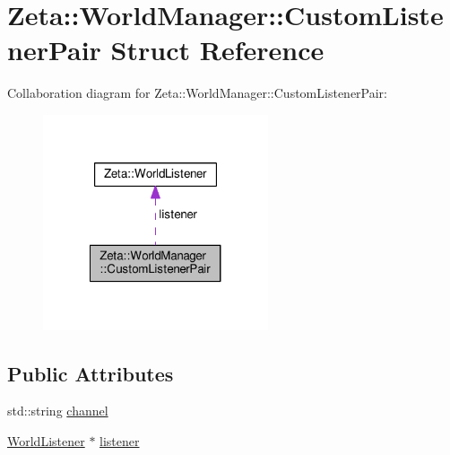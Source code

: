 \hypertarget{structZeta_1_1WorldManager_1_1CustomListenerPair}{\section{Zeta\+:\+:World\+Manager\+:\+:Custom\+Listener\+Pair Struct Reference}
\label{structZeta_1_1WorldManager_1_1CustomListenerPair}
}


Collaboration diagram for Zeta\+:\+:World\+Manager\+:\+:Custom\+Listener\+Pair\+:\nopagebreak
\begin{figure}[H]
\begin{center}
\leavevmode
\includegraphics[width=188pt]{structZeta_1_1WorldManager_1_1CustomListenerPair__coll__graph}
\end{center}
\end{figure}
\subsection*{Public Attributes}
\begin{DoxyCompactItemize}
\item 
std\+::string \hyperlink{structZeta_1_1WorldManager_1_1CustomListenerPair_a73f8c370312bd98d15e9a14a6ef19639}{channel}
\item 
\hyperlink{classZeta_1_1WorldListener}{World\+Listener} $\ast$ \hyperlink{structZeta_1_1WorldManager_1_1CustomListenerPair_ab919df922f917c625f063c4e91d23890}{listener}
\end{DoxyCompactItemize}



